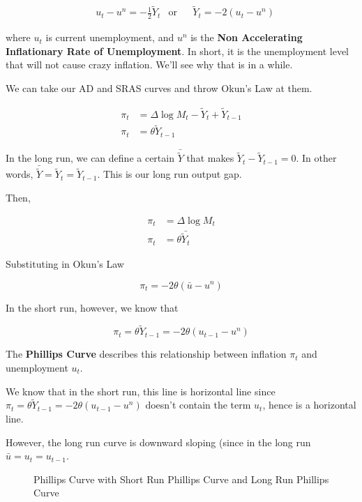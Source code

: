 \documentclass[11pt]{scrartcl}
\newcommand{\og}{\ensuremath{\tilde{Y}}}
\begin{document}
\begin{align*}
&u_t - u^n = - \frac{1}{2} \og_t &\mathrm{or}& &\og_t = - 2(u_t - u^n)
\end{align*}

where $u_t$ is current unemployment, and $u^n$ is the \textbf{Non Accelerating Inflationary Rate of Unemployment}. In short, it is the unemployment level that will not cause crazy inflation. We'll see why that is in a while.

We can take our AD and SRAS curves and throw Okun's Law at them.

\begin{align*}
\pi_t  &= \Delta \log{M_t} - \og_t + \og_{t-1} \\
\pi_t &= \theta \og_{t-1}
\end{align*}

In the long run, we can define a certain $\bar{\og}$ that makes $\og_t - \og_{t-1} = 0$. In other words, $\bar{\og} = \og_t = \og_{t-1}$. This is our long run output gap.

Then,

\begin{align*}
\pi_t  &= \Delta \log{M_t} \\
\pi_t &= \theta \bar{\og_t}
\end{align*}

Substituting in Okun's Law

\[ \pi_t = - 2 \theta (\bar{u} - u^n) \] 

In the short run, however, we know that 

\[ \pi_t = \theta \og_{t-1} = -2 \theta (u_{t-1} - u^n) \] 

The \textbf{Phillips Curve} describes this relationship between inflation $\pi_t$ and unemployment $u_t$.

We know that in the short run, this line is horizontal line since $\pi_t = \theta \og_{t-1} = -2 \theta (u_{t-1} - u^n)$ doesn't contain the term $u_t$, hence is a horizontal line. 

However, the long run curve is downward sloping (since in the long run $\bar{u} = u_t = u_{t-1}$. 

\begin{figure}[H]
\centering
{}
\caption{Phillips Curve with Short Run Phillips Curve and \color{blue} Long Run Phillips Curve}
\end{figure}
\end{document}
